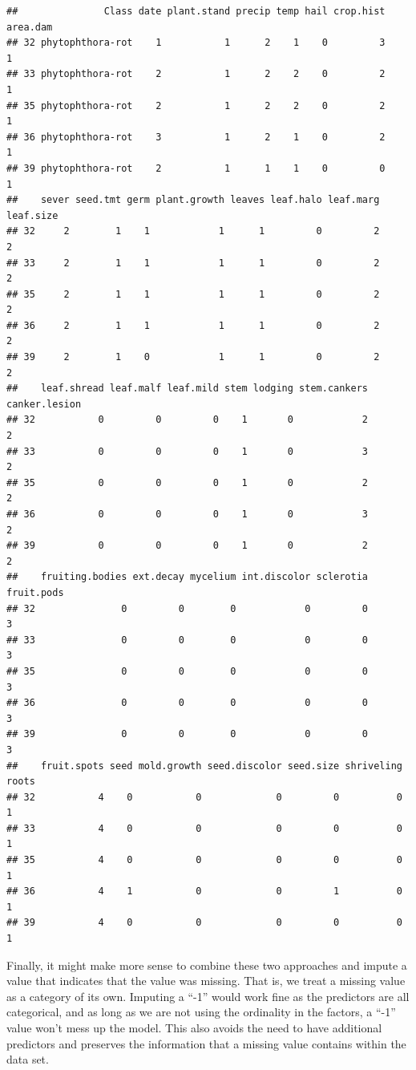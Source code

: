\documentclass[]{book}
\begin{document}
\begin{verbatim}
##               Class date plant.stand precip temp hail crop.hist area.dam
## 32 phytophthora-rot    1           1      2    1    0         3        1
## 33 phytophthora-rot    2           1      2    2    0         2        1
## 35 phytophthora-rot    2           1      2    2    0         2        1
## 36 phytophthora-rot    3           1      2    1    0         2        1
## 39 phytophthora-rot    2           1      1    1    0         0        1
##    sever seed.tmt germ plant.growth leaves leaf.halo leaf.marg leaf.size
## 32     2        1    1            1      1         0         2         2
## 33     2        1    1            1      1         0         2         2
## 35     2        1    1            1      1         0         2         2
## 36     2        1    1            1      1         0         2         2
## 39     2        1    0            1      1         0         2         2
##    leaf.shread leaf.malf leaf.mild stem lodging stem.cankers canker.lesion
## 32           0         0         0    1       0            2             2
## 33           0         0         0    1       0            3             2
## 35           0         0         0    1       0            2             2
## 36           0         0         0    1       0            3             2
## 39           0         0         0    1       0            2             2
##    fruiting.bodies ext.decay mycelium int.discolor sclerotia fruit.pods
## 32               0         0        0            0         0          3
## 33               0         0        0            0         0          3
## 35               0         0        0            0         0          3
## 36               0         0        0            0         0          3
## 39               0         0        0            0         0          3
##    fruit.spots seed mold.growth seed.discolor seed.size shriveling roots
## 32           4    0           0             0         0          0     1
## 33           4    0           0             0         0          0     1
## 35           4    0           0             0         0          0     1
## 36           4    1           0             0         1          0     1
## 39           4    0           0             0         0          0     1
\end{verbatim}

Finally, it might make more sense to combine these two approaches and impute a value that indicates that the value was missing. That is, we treat a missing value as a category of its own. Imputing a ``-1'' would work fine as the predictors are all categorical, and as long as we are not using the ordinality in the factors, a ``-1'' value won't mess up the model. This also avoids the need to have additional predictors and preserves the information that a missing value contains within the data set.
\end{document}
